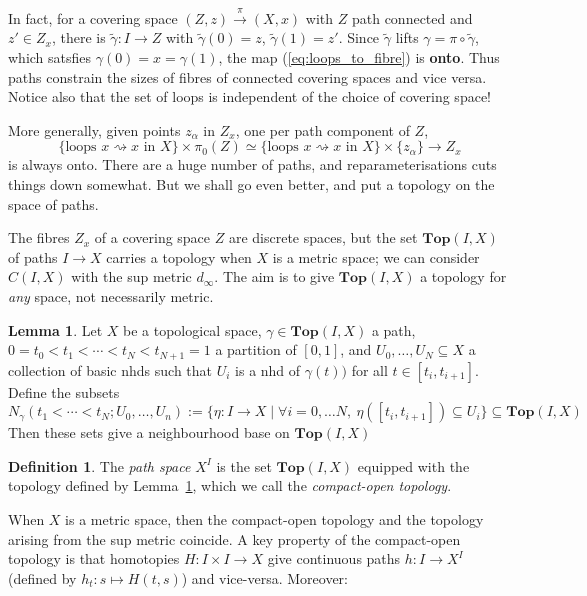 \documentclass{tufte-handout}
\def\Top {\mathbf{Top}}
\theoremstyle{definition}
\newtheorem{lemma}{Lemma}
\newtheorem{definition}{Definition}
\begin{document}
In fact, for a covering space $(Z,z)\xrightarrow{\pi} (X,x)$ with $Z$ path connected 
and $z'\in Z_x$, there is $\widetilde{\gamma}\colon I\to Z$ with $\widetilde{\gamma}(0)=z$, 
$\widetilde{\gamma}(1)=z'$. Since $\widetilde{\gamma}$ lifts $\gamma = \pi\circ \widetilde{\gamma}$, 
which satsfies $\gamma(0) = x = \gamma(1)$, the map (\ref{eq:loops_to_fibre}) is \textbf{onto}.
Thus paths constrain the sizes of fibres of connected covering spaces and vice versa. 
Notice also that the set of loops is independent of the choice of covering space!

More generally, given points $z_\alpha$ in $Z_x$, one per path component of $Z$,
\[
\{\text{loops }x \rightsquigarrow x\text{ in }X\}\times \pi_0(Z) \simeq \{\text{loops }x \rightsquigarrow x\text{ in }X\}\times\{z_\alpha\} \to Z_x
\]
is always onto. There are a huge number of paths, and reparameterisations cuts things down somewhat. 
But we shall go even better, and put a topology on the space of paths.


The fibres $Z_x$ of a covering space $Z$ are discrete spaces, but the set 
$\Top(I,X)$ of paths $I\to X$ carries a topology when $X$ is a metric space; we can 
consider $C(I,X)$ with the sup metric $d_\infty$. The aim is to give $\Top(I,X)$ a 
topology for \emph{any} space, not necessarily metric.

\begin{lemma}\label{lemma:compact_open_base}
Let $X$ be a topological space, $\gamma\in \Top(I,X)$ a path, 
$0=t_0 < t_1 < \cdots < t_N < t_{N+1} = 1$ a partition of $[0,1]$, and $U_0, \ldots, U_N \subseteq X$ 
a collection of basic nhds such that $U_i$ is a nhd of $\gamma(t))$ for all $t\in [t_i,t_{i+1}]$.
Define the subsets
\[
	N_\gamma(t_1<\cdots<t_N;U_0,\ldots,U_n) :=\{\eta\colon I\to X\mid\forall i=0,\ldots N,\ 
		\eta([t_i,t_{i+1}]) \subseteq U_i\} \subseteq \Top(I,X)
\]
Then these sets give a neighbourhood base on $\Top(I,X)$
\end{lemma}

\begin{definition}
The \emph{path space} $X^I$ is the set $\Top(I,X)$ equipped with the topology defined by
Lemma~\ref{lemma:compact_open_base}, which we call the \emph{compact-open topology}.
\end{definition}

When $X$ is a metric space, then the compact-open topology and the topology arising from the 
sup metric coincide. A key property of the compact-open topology is that homotopies $H\colon 
I\times I \to X$ give continuous paths $h\colon I \to X^I$ (defined by $h_t\colon s\mapsto H(t,s)$) and vice-versa. Moreover:
\end{document}
